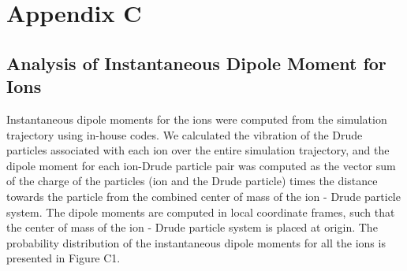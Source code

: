 \chapter{Appendix C}
\setcounter{figure}{0}
\renewcommand{\thefigure}{C.\arabic{figure}}
\renewcommand{\thesection}{C.\arabic{section}}
\section{Analysis of Instantaneous Dipole Moment for Ions}
Instantaneous dipole moments for the ions were computed from the simulation trajectory using in-house codes. We calculated the vibration of the Drude particles associated with each ion over the entire simulation trajectory, and the dipole moment for each ion-Drude particle pair was computed as the vector sum of the charge of the particles (ion and the Drude particle) times the distance towards the particle from the combined center of mass of the ion - Drude particle system. The dipole moments are computed in local coordinate frames, such that the center of mass of the ion - Drude particle system is placed at origin. The probability distribution of the instantaneous dipole moments for all the ions is presented in Figure C1.

